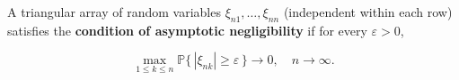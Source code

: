 A triangular array of random variables $\xi_{n1}, \ldots, \xi_{nn}$ (independent within each row) satisfies the \textbf{condition of asymptotic negligibility} if for every $\varepsilon > 0$,

$$\max_{1 \leq k \leq n} \mathbb{P}\bigl\{\,|\xi_{nk}| \geq \varepsilon\,\bigr\} \rightarrow 0, \quad n \rightarrow \infty.$$
